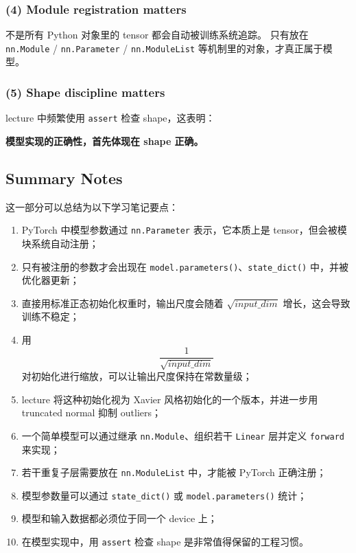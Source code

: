 \documentclass[a4paper,UTF8]{article}
\numberwithin{equation}{section}
\begin{document}
\subsubsection{(4) Module registration matters}

不是所有 Python 对象里的 tensor 都会自动被训练系统追踪。  
只有放在 \verb|nn.Module| / \verb|nn.Parameter| / \verb|nn.ModuleList| 等机制里的对象，才真正属于模型。

\subsubsection{(5) Shape discipline matters}

lecture 中频繁使用 \verb|assert| 检查 shape，这表明：
\begin{center}
\textbf{模型实现的正确性，首先体现在 shape 正确。}
\end{center}

\subsection{Summary Notes}

这一部分可以总结为以下学习笔记要点：

\begin{enumerate}
    \item PyTorch 中模型参数通过 \verb|nn.Parameter| 表示，它本质上是 tensor，但会被模块系统自动注册；
    \item 只有被注册的参数才会出现在 \verb|model.parameters()|、\verb|state_dict()| 中，并被优化器更新；
    \item 直接用标准正态初始化权重时，输出尺度会随着 \(\sqrt{input\_dim}\) 增长，这会导致训练不稳定；
    \item 用
    \[
    \frac{1}{\sqrt{input\_dim}}
    \]
    对初始化进行缩放，可以让输出尺度保持在常数量级；
    \item lecture 将这种初始化视为 Xavier 风格初始化的一个版本，并进一步用 truncated normal 抑制 outliers；
    \item 一个简单模型可以通过继承 \verb|nn.Module|、组织若干 \verb|Linear| 层并定义 \verb|forward| 来实现；
    \item 若干重复子层需要放在 \verb|nn.ModuleList| 中，才能被 PyTorch 正确注册；
    \item 模型参数量可以通过 \verb|state_dict()| 或 \verb|model.parameters()| 统计；
    \item 模型和输入数据都必须位于同一个 device 上；
    \item 在模型实现中，用 \verb|assert| 检查 shape 是非常值得保留的工程习惯。
\end{enumerate}
\end{document}
